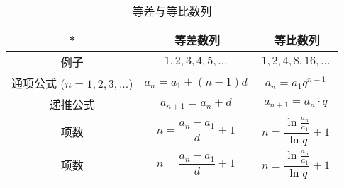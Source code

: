 

\begin{table}[ht]
\centering
\caption{等差与等比数列}\label{tab_AGS1}
\begin{tabular}{|c|c|c|}
\hline
* & 等差数列 & 等比数列 \\
\hline
例子 & $$1,2,3,4,5,...~$$ & $$1,2,4,8,16,...~$$ \\
\hline
通项公式 ($n=1,2,3,...$) & $$a_n = a_1 + (n-1)d~$$ & $$a_n = a_1 q^{n-1}~$$ \\
\hline
递推公式 & $$a_{n+1} = a_n + d~$$ & $$a_{n+1} = a_n \cdot q~$$ \\
\hline
项数& $$n = \frac{a_n-a_1}{d} + 1~$$ & $$n = \frac{\ln{\frac{a_n}{a_1}}}{\ln{q}} + 1~$$ \\
\hline
项数& $$n = \frac{a_n-a_1}{d} + 1~$$ & $$n = \frac{\ln{\frac{a_n}{a_1}}}{\ln{q}} + 1~$$ \\
\hline
\end{tabular}
\end{table}